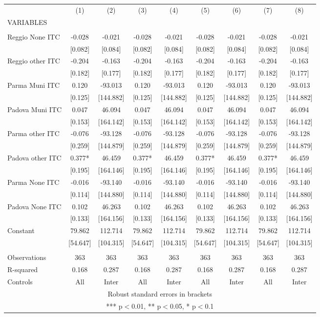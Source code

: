 \begin{tabular}{lcccccccc} \hline
 & (1) & (2) & (3) & (4) & (5) & (6) & (7) & (8) \\
VARIABLES &  &  &  &  &  &  &  &  \\ \hline
 &  &  &  &  &  &  &  &  \\
Reggio None ITC & -0.028 & -0.021 & -0.028 & -0.021 & -0.028 & -0.021 & -0.028 & -0.021 \\
 & [0.082] & [0.084] & [0.082] & [0.084] & [0.082] & [0.084] & [0.082] & [0.084] \\
Reggio other ITC & -0.204 & -0.163 & -0.204 & -0.163 & -0.204 & -0.163 & -0.204 & -0.163 \\
 & [0.182] & [0.177] & [0.182] & [0.177] & [0.182] & [0.177] & [0.182] & [0.177] \\
Parma Muni ITC & 0.120 & -93.013 & 0.120 & -93.013 & 0.120 & -93.013 & 0.120 & -93.013 \\
 & [0.125] & [144.882] & [0.125] & [144.882] & [0.125] & [144.882] & [0.125] & [144.882] \\
Padova Muni ITC & 0.047 & 46.094 & 0.047 & 46.094 & 0.047 & 46.094 & 0.047 & 46.094 \\
 & [0.153] & [164.142] & [0.153] & [164.142] & [0.153] & [164.142] & [0.153] & [164.142] \\
Parma other ITC & -0.076 & -93.128 & -0.076 & -93.128 & -0.076 & -93.128 & -0.076 & -93.128 \\
 & [0.259] & [144.879] & [0.259] & [144.879] & [0.259] & [144.879] & [0.259] & [144.879] \\
Padova other ITC & 0.377* & 46.459 & 0.377* & 46.459 & 0.377* & 46.459 & 0.377* & 46.459 \\
 & [0.195] & [164.146] & [0.195] & [164.146] & [0.195] & [164.146] & [0.195] & [164.146] \\
Parma None ITC & -0.016 & -93.140 & -0.016 & -93.140 & -0.016 & -93.140 & -0.016 & -93.140 \\
 & [0.114] & [144.880] & [0.114] & [144.880] & [0.114] & [144.880] & [0.114] & [144.880] \\
Padova None ITC & 0.102 & 46.263 & 0.102 & 46.263 & 0.102 & 46.263 & 0.102 & 46.263 \\
 & [0.133] & [164.156] & [0.133] & [164.156] & [0.133] & [164.156] & [0.133] & [164.156] \\
Constant & 79.862 & 112.714 & 79.862 & 112.714 & 79.862 & 112.714 & 79.862 & 112.714 \\
 & [54.647] & [104.315] & [54.647] & [104.315] & [54.647] & [104.315] & [54.647] & [104.315] \\
 &  &  &  &  &  &  &  &  \\
Observations & 363 & 363 & 363 & 363 & 363 & 363 & 363 & 363 \\
R-squared & 0.168 & 0.287 & 0.168 & 0.287 & 0.168 & 0.287 & 0.168 & 0.287 \\
 Controls & All & Inter & All & Inter & All & Inter & All & Inter \\ \hline
\multicolumn{9}{c}{ Robust standard errors in brackets} \\
\multicolumn{9}{c}{ *** p$<$0.01, ** p$<$0.05, * p$<$0.1} \\
\end{tabular}
